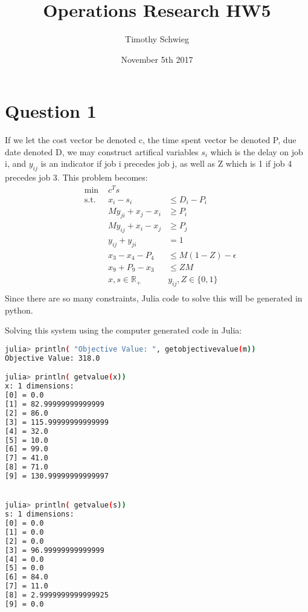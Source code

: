 \documentclass[10pt, letterpaper]{paper}
\title{ Operations Research HW5 }
\author{ Timothy Schwieg }
\date{ November 5th 2017 }
\begin{document}
\maketitle

\section*{Question 1 }

If we let the cost vector be denoted c, the time spent vector be denoted P, due date denoted D, we may construct artifical variables $s_i$ which is the delay on job i, and $y_{ij}$ is an indicator if job i precedes job j, as well as Z which is 1 if job 4 precedes job 3.
\newline
This problem becomes:
\begin{equation*}
\begin{alignedat}{3}
&\text{min }&c^T s&\\
&\text{s.t. } &x_i - s_i&\leq D_i - P_i\\
& &M y_{ji} + x_j - x_i  &\geq P_i\\
& &M y_{ij} + x_i - x_j  &\geq P_j\\
& &y_{ij} + y_{ji} &= 1\\
& &x_3 - x_4 - P_4 &\leq M( 1 - Z ) - \epsilon\\
& &x_9 + P_9 - x_3 &\leq Z M\\
& &x,s \in \mathbb{R}_+ \quad& y_{ij},Z \in \{0,1\}\\
\end{alignedat}
\end{equation*}
Since there are so many constraints, Julia code to solve this will be generated in python.



Solving this system using the computer generated code in Julia:

%


\begin{lstlisting}[language=sh]
julia> println( "Objective Value: ", getobjectivevalue(m))
Objective Value: 318.0

julia> println( getvalue(x))
x: 1 dimensions:
[0] = 0.0
[1] = 82.99999999999999
[2] = 86.0
[3] = 115.99999999999999
[4] = 32.0
[5] = 10.0
[6] = 99.0
[7] = 41.0
[8] = 71.0
[9] = 130.99999999999997


julia> println( getvalue(s))
s: 1 dimensions:
[0] = 0.0
[1] = 0.0
[2] = 0.0
[3] = 96.99999999999999
[4] = 0.0
[5] = 0.0
[6] = 84.0
[7] = 11.0
[8] = 2.9999999999999925
[9] = 0.0
\end{lstlisting}
\end{document}
